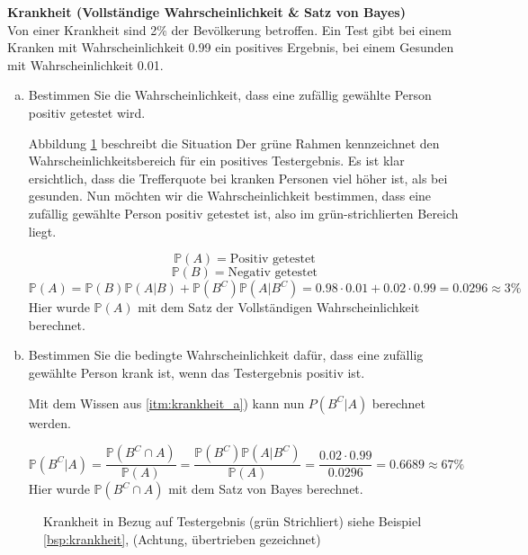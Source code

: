 {    \begin{bsp}\label{bsp:krankheit} \textbf{Krankheit (Vollständige Wahrscheinlichkeit \& Satz von Bayes)}\\

    Von einer Krankheit sind 2\% der Bevölkerung betroffen. Ein Test gibt
    bei einem Kranken mit Wahrscheinlichkeit 0.99 ein positives Ergebnis,
    bei einem Gesunden mit Wahrscheinlichkeit 0.01.

    \begin{enumerate}[a)]
        \item \label{itm:krankheit_a}Bestimmen Sie die Wahrscheinlichkeit, dass eine zufällig gewählte
            Person positiv getestet wird.

            Abbildung \ref{fig:krankheit} beschreibt die Situation Der grüne Rahmen kennzeichnet den
            Wahrscheinlichkeitsbereich für ein positives Testergebnis. Es ist klar
            ersichtlich, dass die Trefferquote bei kranken Personen viel höher ist,
            als bei gesunden. Nun möchten wir die Wahrscheinlichkeit bestimmen,
            dass eine zufällig gewählte Person positiv getestet ist, also im
            grün-strichlierten Bereich liegt.

            \[\mathbb P\left(A\right)=\text{Positiv getestet}\]
            \[\mathbb P\left(B\right)=\text{Negativ getestet}\]
            \[\mathbb P\left(A\right)=\mathbb P\left(B\right)\mathbb P\left(A|B\right)+\mathbb P\left(B^{C}\right)\mathbb P\left(A|B^{C}\right) = 0.98\cdot 0.01+0.02\cdot 0.99=0.0296\approx 3\%\]
            Hier wurde $\mathbb P(A)$ mit dem Satz der Vollständigen Wahrscheinlichkeit berechnet. 
        \item Bestimmen Sie die bedingte Wahrscheinlichkeit dafür, dass eine
            zufällig gewählte Person krank ist, wenn das Testergebnis positiv ist.

            Mit dem Wissen aus \ref{itm:krankheit_a}) kann nun  $P(B^{C}|A)$ berechnet werden.

            \[
                \mathbb P(B^{C}|A)=\frac{\mathbb P(B^{C}\cap A)}{\mathbb P\left(A\right)}=
                \frac{\mathbb P\left(B^{C}\right)\mathbb P(A|B^{C})}{\mathbb P(A)}=\frac{0.02\cdot 0.99}{0.0296}=0.6689\approx 67\%
            \]
            Hier wurde $\mathbb P\left(B^{C}\cap A\right)$ mit dem Satz von Bayes berechnet.
        \end{enumerate}
    \end{bsp}

    \begin{figure}
    \centering
        \begin{tikzpicture}
            
        \end{tikzpicture}
        \caption{Krankheit in Bezug auf Testergebnis (grün Strichliert) siehe Beispiel \ref{bsp:krankheit}, (Achtung, übertrieben gezeichnet)}
        \label{fig:krankheit}
    \end{figure}


    \ifdefined\uebsps
    
    \fi
}
